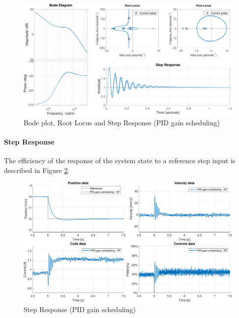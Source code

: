 \begin{figure}[H]
    \centering
    \includegraphics[width=1\linewidth]{./img/MATLAB/controllers/PID_gain_scheduling.pdf}
    \caption{Bode plot, Root Locus and Step Response (PID gain scheduling)}
    \label{fig:pid_gain_scheduling_bode_diagram}
\end{figure}

\paragraph{Step Response}

The efficiency of the response of the system state to a reference step input is described in Figure \ref{fig:pid_gain_scheduling_step_response}.

\begin{figure}[H]
    \centering
    \includegraphics[width=1\linewidth]{./img/MATLAB/results/step_PID_gain_scheduling_KF.pdf}
    \caption{Step Response (PID gain scheduling)}
    \label{fig:pid_gain_scheduling_step_response}
\end{figure}

